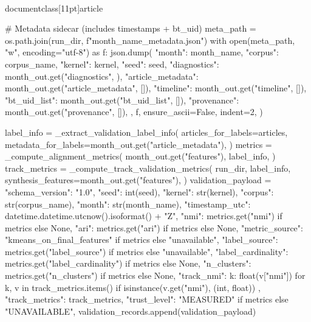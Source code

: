 \\documentclass[11pt]{article}
\begin{document}
\begin{CodeBlock}
                # Metadata sidecar (includes timestamps + bt_uid)
                meta_path = os.path.join(run_dir, f"{month_name}_metadata.json")
                with open(meta_path, "w", encoding="utf-8") as f:
                    json.dump(
                        {
                            "month": month_name,
                            "corpus": corpus_name,
                            "kernel": kernel,
                            "seed": seed,
                            "diagnostics": month_out.get("diagnostics", {}),
                            "article_metadata": month_out.get("article_metadata", []),
                            "timeline": month_out.get("timeline", []),
                            "bt_uid_list": month_out.get("bt_uid_list", []),
                            "provenance": month_out.get("provenance", []),
                        },
                        f,
                        ensure_ascii=False,
                        indent=2,
                    )

                label_info = _extract_validation_label_info(
                    articles_for_labels=articles,
                    metadata_for_labels=month_out.get("article_metadata"),
                )
                metrics = _compute_alignment_metrics(
                    month_out.get("features"),
                    label_info,
                )
                track_metrics = _compute_track_validation_metrics(
                    run_dir,
                    label_info,
                    synthesis_features=month_out.get("features"),
                )
                validation_payload = {
                    "schema_version": "1.0",
                    "seed": int(seed),
                    "kernel": str(kernel),
                    "corpus": str(corpus_name),
                    "month": str(month_name),
                    "timestamp_utc": datetime.datetime.utcnow().isoformat() + "Z",
                    "nmi": metrics.get("nmi") if metrics else None,
                    "ari": metrics.get("ari") if metrics else None,
                    "metric_source": "kmeans_on_final_features" if metrics else "unavailable",
                    "label_source": metrics.get("label_source") if metrics else "unavailable",
                    "label_cardinality": metrics.get("label_cardinality") if metrics else None,
                    "n_clusters": metrics.get("n_clusters") if metrics else None,
                    "track_nmi": {
                        k: float(v["nmi"])
                        for k, v in track_metrics.items()
                        if isinstance(v.get("nmi"), (int, float))
                    },
                    "track_metrics": track_metrics,
                    "trust_level": "MEASURED" if metrics else "UNAVAILABLE",
                }
                validation_records.append(validation_payload)


\end{CodeBlock}
\end{document}
